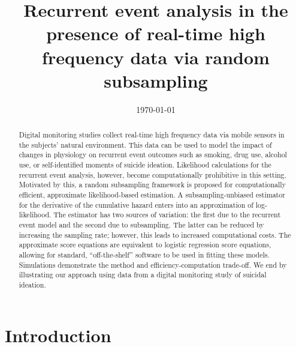 \documentclass[12pt]{amsart}
\begin{document}
\title[Recurrent event analysis with functional covariates via random subsampling]{Recurrent event analysis in the presence of real-time high frequency data via random subsampling}

\date{\today}

\begin{abstract}
Digital monitoring studies collect real-time high frequency data via mobile sensors in the subjects' natural environment. This data can be used to model the impact of changes in physiology on recurrent event outcomes such as smoking, drug use, alcohol use, or self-identified moments of suicide ideation. Likelihood calculations for the recurrent event analysis, however, become computationally prohibitive in this setting. Motivated by this, a random subsampling framework is proposed for computationally efficient, approximate likelihood-based estimation. A subsampling-unbiased estimator for the derivative of the cumulative hazard enters into an approximation of log-likelihood. The estimator has two sources of variation: the first due to the recurrent event model and the second due to subsampling. The latter can be reduced by increasing the sampling rate; however, this leads to increased computational costs.  The approximate score equations are equivalent to logistic regression score equations, allowing for standard, ``off-the-shelf'' software to be used in fitting these models. Simulations demonstrate the method and efficiency-computation trade-off. We end by illustrating our approach using data from a digital monitoring study of suicidal ideation.
\end{abstract}


\maketitle

\section{Introduction}
\end{document}
